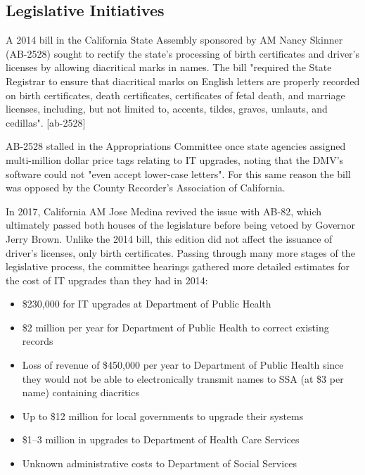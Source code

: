 \subsection{Legislative Initiatives}

A 2014 bill in the California State Assembly sponsored by AM Nancy Skinner
(AB-2528) sought to rectify the state's processing of birth certificates and
driver's licenses by allowing diacritical marks in names. The bill "required the
State Registrar to ensure that diacritical marks on English letters are properly
recorded on birth certificates, death certificates, certificates of fetal death,
and marriage licenses, including, but not limited to, accents, tildes, graves,
umlauts, and cedillas". [ab-2528]

AB-2528 stalled in the Appropriations Committee once state agencies assigned
multi-million dollar price tags relating to IT upgrades, noting that the DMV's
software could not "even accept lower-case letters". For this same reason the
bill was opposed by the County Recorder's Association of California.

In 2017, California AM Jose Medina revived the issue with AB-82, which
ultimately passed both houses of the legislature before being vetoed by Governor
Jerry Brown. Unlike the 2014 bill, this edition did not affect the issuance of
driver's licenses, only birth certificates. Passing through many more stages of
the legislative process, the committee hearings gathered more detailed estimates
for the cost of IT upgrades than they had in 2014:

\begin{itemize}

\item \$230,000 for IT upgrades at Department of Public Health
\item \$2 million per year for Department of Public Health to correct existing
records
\item Loss of revenue of \$450,000 per year to Department of Public Health since
they would not be able to electronically transmit names to SSA (at \$3 per name)
containing diacritics
\item Up to \$12 million for local governments to upgrade their systems
\item \$1--3 million in upgrades to Department of Health Care Services
\item Unknown administrative costs to Department of Social Services

\end{itemize}

